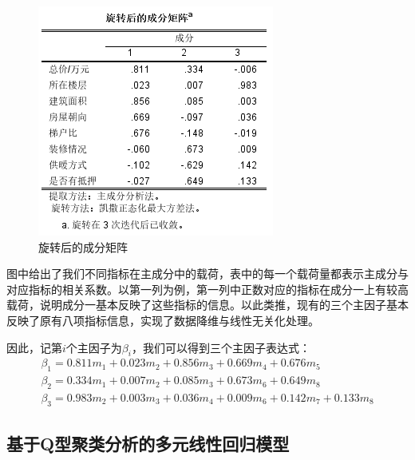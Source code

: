\documentclass[withoutpreface,bwprint]{cumcmthesis} %
\begin{document}
\begin{figure}[H]
    \centering
    \includegraphics[scale=1.1]{旋转后的成分矩阵.png}
    \caption{旋转后的成分矩阵}
    \label{fig:旋转后的成分矩阵}
\end{figure}
图中给出了我们不同指标在主成分中的载荷，表中的每一个载荷量都表示主成分与对应指标的相关系数。以第一列为例，第一列中正数对应的指标在成分一上有较高载荷，说明成分一基本反映了这些指标的信息。以此类推，现有的三个主因子基本反映了原有八项指标信息，实现了数据降维与线性无关化处理。

因此，记第$i$个主因子为$\beta_{i}$，我们可以得到三个主因子表达式：
\begin{gather}
   \beta _{1}=0.811m_{1}+0.023m_{2}+0.856m_{3}+0.669m_{4}+0.676m_{5}\\
   \beta _{2}=0.334m_{1}+0.007m_{2}+0.085m_{3}+0.673m_{6}+0.649m_{8}\\
   \beta _{3}=0.983m_{2}+0.003m_{3}+0.036m_{4}+0.009m_{6}+0.142m_{7}+0.133m_{8}
\end{gather}
                                    
\subsection{基于Q型聚类分析的多元线性回归模型}
\end{document}
